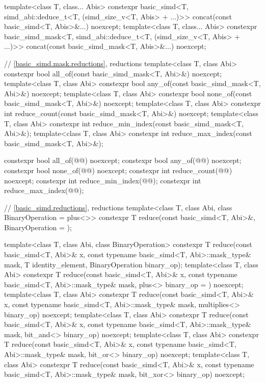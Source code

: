 \begin{codeblock}
{  template<class T, class... Abis>
    constexpr basic_simd<T, simd_abi::deduce_t<T, (simd_size_v<T, Abis> + ...)>>
      concat(const basic_simd<T, Abis>&...) noexcept;
  template<class T, class... Abis>
    constexpr basic_simd_mask<T, simd_abi::deduce_t<T, (simd_size_v<T, Abis> + ...)>>
      concat(const basic_simd_mask<T, Abis>&...) noexcept;

  // \ref{basic_simd.mask.reductions},  reductions
  template<class T, class Abi> constexpr bool all_of(const basic_simd_mask<T, Abi>&) noexcept;
  template<class T, class Abi> constexpr bool any_of(const basic_simd_mask<T, Abi>&) noexcept;
  template<class T, class Abi> constexpr bool none_of(const basic_simd_mask<T, Abi>&) noexcept;
  template<class T, class Abi> constexpr int reduce_count(const basic_simd_mask<T, Abi>&) noexcept;
  template<class T, class Abi> constexpr int reduce_min_index(const basic_simd_mask<T, Abi>&);
  template<class T, class Abi> constexpr int reduce_max_index(const basic_simd_mask<T, Abi>&);

  constexpr bool all_of(@@) noexcept;
  constexpr bool any_of(@@) noexcept;
  constexpr bool none_of(@@) noexcept;
  constexpr int reduce_count(@@) noexcept;
  constexpr int reduce_min_index(@@);
  constexpr int reduce_max_index(@@);

  // \ref{basic_simd.reductions},  reductions
  template<class T, class Abi, class BinaryOperation = plus<>>
    constexpr T reduce(const basic_simd<T, Abi>&, BinaryOperation = {});

  template<class T, class Abi, class BinaryOperation>
    constexpr T reduce(const basic_simd<T, Abi>& x, const typename basic_simd<T, Abi>::mask_type& mask,
                       T identity_element, BinaryOperation binary_op);
  template<class T, class Abi>
    constexpr T reduce(const basic_simd<T, Abi>& x, const typename basic_simd<T, Abi>::mask_type& mask,
                       plus<> binary_op = {}) noexcept;
  template<class T, class Abi>
    constexpr T reduce(const basic_simd<T, Abi>& x, const typename basic_simd<T, Abi>::mask_type& mask,
                       multiplies<> binary_op) noexcept;
  template<class T, class Abi>
    constexpr T reduce(const basic_simd<T, Abi>& x, const typename basic_simd<T, Abi>::mask_type& mask,
                       bit_and<> binary_op) noexcept;
  template<class T, class Abi>
    constexpr T reduce(const basic_simd<T, Abi>& x, const typename basic_simd<T, Abi>::mask_type& mask,
                       bit_or<> binary_op) noexcept;
  template<class T, class Abi>
    constexpr T reduce(const basic_simd<T, Abi>& x, const typename basic_simd<T, Abi>::mask_type& mask,
                       bit_xor<> binary_op) noexcept;

}
\end{codeblock}
